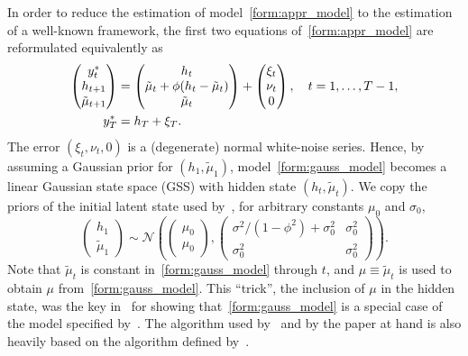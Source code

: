 In order to reduce the estimation of model~\eqref{form:appr_model} to the estimation of a well-known framework, the first two equations of~\eqref{form:appr_model} are reformulated equivalently as
\begin{equation}
\begin{alignedat}{2}\label{form:gauss_model}
\begin{pmatrix}
y_t^\ast \\
h_{t+1} \\
\tilde{\mu}_{t+1}
\end{pmatrix} &=
\begin{pmatrix}
h_t \\
\tilde{\mu}_t+\phi(h_t-\tilde{\mu}_t) \\
\tilde \mu_t
\end{pmatrix} +
\begin{pmatrix}
\xi_t \\
\nu_t \\
0
\end{pmatrix}, \quad t=1,\dots,T-1, \\
y_T^\ast &= h_T+\xi_T.
\end{alignedat}
\end{equation}
The error $(\xi_t,\nu_t,0)$ is a (degenerate) normal white-noise series. Hence, by assuming a Gaussian prior for $\left(h_1,\tilde\mu_1\right)$, model~\eqref{form:gauss_model} becomes a linear Gaussian state space (GSS) with hidden state $(h_t,\tilde{\mu}_t)$.
We copy the priors of the initial latent state used by~\citet{Omori2007}, for arbitrary constants $\mu_0$ and $\sigma_0$,
\begin{equation*}
\begin{pmatrix}
h_1 \\
\tilde\mu_1
\end{pmatrix} \sim
\mathcal{N}\left(
\begin{pmatrix}
\mu_0 \\
\mu_0
\end{pmatrix},
\begin{pmatrix}
\sigma^2/(1-\phi^2)+\sigma_0^2 & \sigma_0^2 \\
\sigma_0^2 & \sigma_0^2
\end{pmatrix}
\right).
\end{equation*}
Note that $\tilde{\mu}_t$ is constant in~\eqref{form:gauss_model} through $t$, and $\mu\equiv\tilde{\mu}_t$ is used to obtain $\mu$ from~\eqref{form:gauss_model}.
This ``trick'', the inclusion of $\mu$ in the hidden state, was the key in~\citet{Omori2007} for showing that~\eqref{form:gauss_model} is a special case of the model specified by~\citet{de1995simulation}.
The algorithm used by~\citet{Omori2007} and by the paper at hand is also heavily based on the algorithm defined by~\citet{de1995simulation}.

